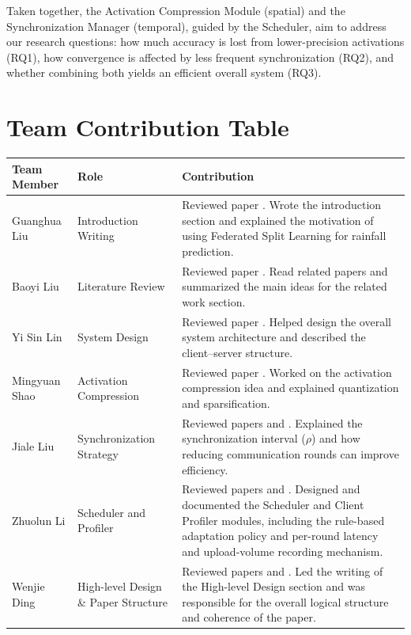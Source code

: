 \documentclass[conference]{IEEEtran}
\begin{document}
Taken together, the Activation Compression Module (spatial) and the Synchronization Manager (temporal), guided by the Scheduler, aim to address our research questions: how much accuracy is lost from lower-precision activations (RQ1), how convergence is affected by less frequent synchronization (RQ2), and whether combining both yields an efficient overall system (RQ3).








\appendix
\section{Team Contribution Table}

\begin{center}
\begin{tabular}{|p{3.5cm}|p{3cm}|p{9cm}|}
\hline
\textbf{Team Member} & \textbf{Role} & \textbf{Contribution} \\
\hline

Guanghua Liu & Introduction Writing &
Reviewed paper \cite{10522472}. Wrote the introduction section and explained the motivation of using Federated Split Learning for rainfall prediction. \\
\hline

Baoyi Liu & Literature Review &
Reviewed paper \cite{10478872}. Read related papers and summarized the main ideas for the related work section. \\
\hline

Yi Sin Lin & System Design &
Reviewed paper \cite{10078005}. Helped design the overall system architecture and described the client--server structure. \\
\hline

Mingyuan Shao & Activation Compression &
Reviewed paper \cite{10050151}. Worked on the activation compression idea and explained quantization and sparsification. \\
\hline

Jiale Liu & Synchronization Strategy &
Reviewed papers \cite{2024ITWC...23.7362C} and \cite{2021arXiv210709786C}. Explained the synchronization interval ($\rho$) and how reducing communication rounds can improve efficiency. \\
\hline

Zhuolun Li & Scheduler and Profiler &
Reviewed papers \cite{10.3389/frwa.2024.1378598} and \cite{CHAN2023100375}. Designed and documented the Scheduler and Client Profiler modules, including the rule-based adaptation policy and per-round latency and upload-volume recording mechanism. \\
\hline

Wenjie Ding & High-level Design \& Paper Structure &
Reviewed papers \cite{2023arXiv230205599M} and \cite{2026ITWC...25.1981L}. Led the writing of the High-level Design section and was responsible for the overall logical structure and coherence of the paper. \\
\hline

\end{tabular}
\end{center}
\end{document}
